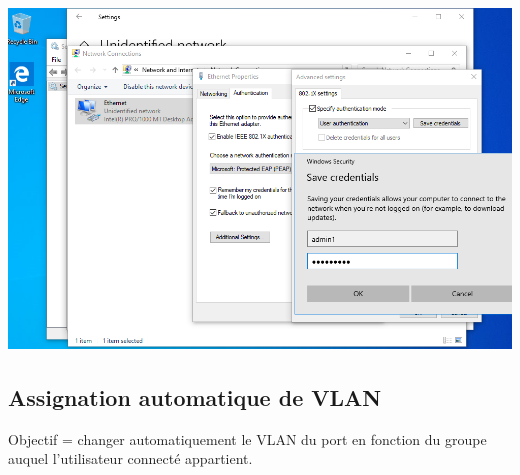 \documentclass[a4paper]{article}
\begin{document}
\begin{center} \includegraphics[width=0.90\linewidth]{images/connect-01.png} \end{center}










\subsection{Assignation automatique de VLAN}





Objectif = changer automatiquement le VLAN du port en fonction du groupe auquel l’utilisateur connecté appartient.
\end{document}
